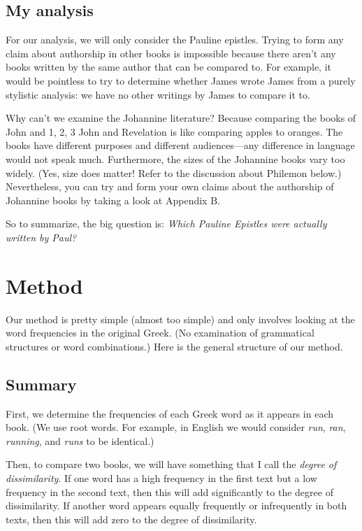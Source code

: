 \documentclass[12pt,letterpaper]{article}
\begin{document}
\subsection{My analysis}

For our analysis, we will only consider the Pauline epistles.  Trying to form any claim about authorship in other books is impossible because there aren't any books written by the same author that can be compared to.  For example, it would be pointless to try to determine whether James wrote James from a purely stylistic analysis: we have no other writings by James to compare it to.  

Why can't we examine the Johannine literature?  Because comparing the books of John and 1, 2, 3 John and Revelation is like comparing apples to oranges.  The books have different purposes and different audiences---any difference in language would not speak much.  Furthermore, the sizes of the Johannine books vary too widely.  (Yes, size does matter!  Refer to the discussion about Philemon below.)  Nevertheless, you can try and form your own claims about the authorship of Johannine books by taking a look at Appendix B.  

So to summarize, the big question is: \emph{Which Pauline Epistles were actually written by Paul?}

\section{Method}
Our method is pretty simple (almost too simple) and only involves looking at the word frequencies in the original Greek.  (No examination of grammatical structures or word combinations.)  Here is the general structure of our method. 

\subsection{Summary} 

First, we determine the frequencies of each Greek word as it appears in each book.  (We use root words.  For example, in English we would consider \emph{run}, \emph{ran}, \emph{running}, and \emph{runs} to be identical.)  

Then, to compare two books, we will have something that I call the \emph{degree of dissimilarity}.  If one word has a high frequency in the first text but a low frequency in the second text, then this will add significantly to the degree of dissimilarity.  If another word appears equally frequently or infrequently in both texts, then this will add zero to the degree of dissimilarity.  
\end{document}
